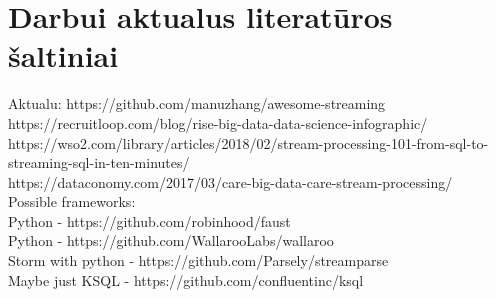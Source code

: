 \documentclass{VUMIFPSbakalaurinis}
\begin{document}
\section{Darbui aktualus literatūros šaltiniai}
Aktualu: https://github.com/manuzhang/awesome-streaming \\
https://recruitloop.com/blog/rise-big-data-data-science-infographic/ \\
https://wso2.com/library/articles/2018/02/stream-processing-101-from-sql-to-streaming-sql-in-ten-minutes/ \\
https://dataconomy.com/2017/03/care-big-data-care-stream-processing/ \\
Possible frameworks: \\
 Python - https://github.com/robinhood/faust \\
 Python - https://github.com/WallarooLabs/wallaroo \\
 Storm with python - https://github.com/Parsely/streamparse \\
 Maybe just KSQL - https://github.com/confluentinc/ksql \\
 
\end{document}
